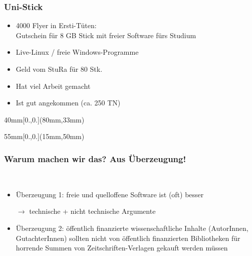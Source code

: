 \documentclass[t]{beamer}
\begin{document}
\begin{frame}[label=ct1b]
  \frametitle{Uni-Stick}

  \vspace{-5mm}

  \begin{itemize}
  \item 4000 Flyer in Ersti-Tüten:\\
    Gutschein für 8 GB Stick mit freier Software fürs Studium
  \item Live-Linux / freie Windows-Programme
  \item Geld vom StuRa für 80 Stk.
    \pause
  \item Hat viel Arbeit gemacht
    \pause
  \item Ist gut angekommen (ca. 250 TN)
  \end{itemize}

  \begin{textblock*}{40mm}[0.,0.](80mm,33mm)
  \end{textblock*}

  \begin{textblock*}{55mm}[0.,0.](15mm,50mm)
  \end{textblock*}

\end{frame}

\begin{frame}[label=ct2]
  \frametitle{Warum machen wir das? Aus Überzeugung!}

  ~\\[6mm]

  \begin{itemize}
  \item Überzeugung 1: freie und quelloffene Software ist (oft) besser
  \item[$\rightarrow$] technische + nicht technische Argumente\\[8mm]
    \pause
  \item Überzeugung 2: öffentlich finanzierte wissenschaftliche Inhalte
    (AutorInnen, GutachterInnen) sollten nicht von öffentlich finanzierten
    Bibliotheken für horrende Summen von Zeitschriften-Verlagen gekauft werden
    müssen
  \end{itemize}
\end{frame}
\end{document}
